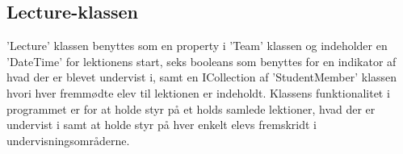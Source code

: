 \subsection{Lecture-klassen}
'Lecture' klassen benyttes som en property i 'Team' klassen og indeholder en 'DateTime' for lektionens start, seks booleans som benyttes for en indikator af hvad der er blevet undervist i, samt en ICollection af 'StudentMember' klassen hvori hver fremmødte elev til lektionen er indeholdt.
Klassens funktionalitet i programmet er for at holde styr på et holds samlede lektioner, hvad der er undervist i samt at holde styr på hver enkelt elevs fremskridt i undervisningsområderne.